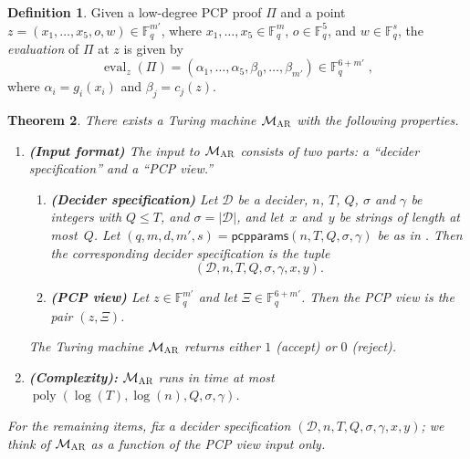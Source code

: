 \documentclass[11pt]{article}
\newtheorem{theorem}{Theorem}[section]
\theoremstyle{definition}
\newtheorem{definition}[theorem]{Definition}
\newcommand{\F}{\ensuremath{\mathbb{F}}}
\DeclareMathOperator{\poly}{poly}
\newcommand{\decider}{\mathcal{D}}
\newcommand{\gamestyle}[1]{\ensuremath{\textsc{#1}}\xspace}
\newcommand{\ar}{\gamestyle{AR}}
\newcommand{\pcpparams}{\mathsf{pcpparams}}
\newcommand{\pcpeval}{\Xi}
\newcommand{\pcpverifier}{\mathcal{M}_\ar}
\newcommand{\qlen}{Q}
\DeclareMathOperator{\ev}{eval}
\begin{document}
\begin{definition}\label{def:pcp-eval}
  Given a low-degree PCP proof $\Pi$ and a point $z = (x_1, \dots, x_5, o, w)
  \in \F_q^{m'}$, where $x_1, \dots, x_5 \in \F_q^{m}$, $o \in \F_q^{5}$, and $w
  \in \F_q^{s}$, the \emph{evaluation} of $\Pi$ at $z$ is given by
  \[
    \ev_z(\Pi) = (\alpha_1, \dots, \alpha_5, \beta_0, \dots, \beta_{m'}) \in
    \F_{q}^{6 + m'}\;,
  \]
  where $\alpha_i = g_i(x_i)$ and $\beta_j = c_j(z)$.
\end{definition}

\begin{theorem}\label{thm:pcp-decider}
  There exists a Turing machine $\pcpverifier$ with the following properties.
  \begin{enumerate}
  \item \textbf{(Input format)} The input to $\pcpverifier$ consists of two parts:
    a ``decider specification'' and a ``PCP view.''
    \begin{enumerate}
    \item \textbf{(Decider specification)} Let $\decider$ be a decider, $n$,
      $T$, $\qlen$, $\sigma$ and $\gamma$ be integers with $\qlen \leq T$, and
      $\sigma = |\decider|$, and let~$x$ and~$y$ be strings of length at
      most~$\qlen$.
      Let $(q,m,d,m',s) = \pcpparams(n, T, \qlen,\sigma, \gamma)$ be as in
      .
      Then the corresponding decider specification is the tuple
      \[
        (\decider, n, T, \qlen, \sigma, \gamma, x, y).
      \]
    \item \textbf{(PCP view)} Let $z \in \F_{q}^{m'}$ and let $\pcpeval \in
      \F_q^{6 + m'}$.
      Then the PCP view is the pair $(z, \pcpeval)$.
    \end{enumerate}
    The Turing machine $\pcpverifier$ returns either $1$ (accept) or $0$
    (reject).
  \item
    \textbf{(Complexity):} 
$\pcpverifier$ runs in time at most~$\poly(\log(T), \log(n), \qlen, \sigma, \gamma)$.
        
  \end{enumerate}
  For the remaining items, fix a decider specification $(\decider, n, T, \qlen,
  \sigma, \gamma, x, y)$; we think of $\pcpverifier$ as a function of the PCP view
  input only.


\end{theorem}
\end{document}
